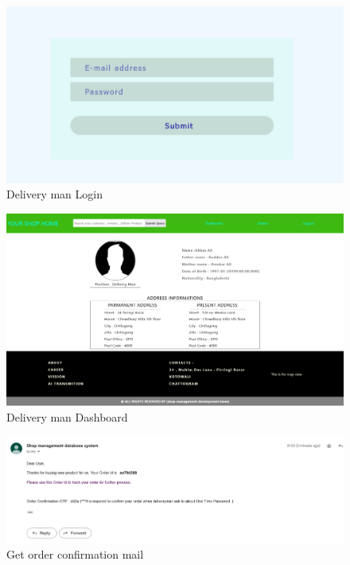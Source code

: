 \begin{figure}[ht]
    \centering  
    \includegraphics[width=\textwidth, height=0.8\textheight, keepaspectratio]{designs/deliveryman login.png}    
    \caption{Delivery man Login}
    \label{fig:fig 6.2.30}
\end{figure}
\begin{figure}[ht]
    \centering  
    \includegraphics[width=\textwidth, height=0.8\textheight, keepaspectratio]{designs/deliveryman-dashboard.png}    
    \caption{Delivery man Dashboard}
    \label{fig:fig 6.2.31}
\end{figure}
\begin{figure}[ht]
        \centering  
        \includegraphics[width=\textwidth]{designs/order confirmation mail.png}    
        \caption{Get order confirmation mail}
        \label{fig:fig 6.2.10}
    \end{figure} 
